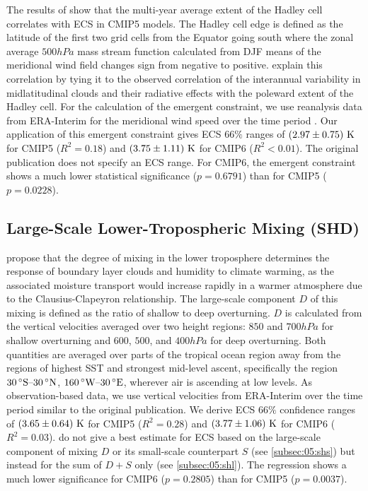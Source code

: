 The results of \textcite{Lipat2017} show that the multi-year average extent of
the Hadley cell correlates with \acs{ECS} in \acs{CMIP}5 models. The Hadley
cell edge is defined as the latitude of the first two grid cells from the
Equator going south where the zonal average $500 \unit{hPa}$ mass stream
function calculated from \ac{DJF} means of the meridional wind field changes
sign from negative to positive. \Textcite{Lipat2017} explain this correlation
by tying it to the observed correlation of the interannual variability in
midlatitudinal clouds and their radiative effects with the poleward extent of
the Hadley cell. For the calculation of the emergent constraint, we use
reanalysis data from ERA-Interim \autocite{Dee2011} for the meridional wind
speed over the time period . Our application of this emergent
constraint gives \ac{ECS} $66 \unit{\%}$ ranges of
$\pmrangeunit{2.97}{0.75}{K}$ for \acs{CMIP}5 ($R^2 = 0.18$) and
$\pmrangeunit{3.75}{1.11}{K}$ for \acs{CMIP}6 ($R^2 < 0.01$). The original
publication does not specify an \ac{ECS} range. For \acs{CMIP}6, the emergent
constraint shows a much lower statistical significance ($p = 0.6791$) than for
\acs{CMIP}5 ($p = 0.0228$).


\subsection{Large-Scale Lower-Tropospheric Mixing (SHD)}
\label{subsec:05:shd}

\textcite{Sherwood2014} propose that the degree of mixing in the lower
troposphere determines the response of boundary layer clouds and humidity to
climate warming, as the associated moisture transport would increase rapidly in
a warmer atmosphere due to the Clausius-Clapeyron relationship. The large-scale
component $D$ of this mixing is defined as the ratio of shallow to deep
overturning. $D$ is calculated from the vertical velocities averaged over two
height regions: $850$ and $700 \unit{hPa}$ for shallow overturning and $600$,
$500$, and $400 \unit{hPa}$ for deep overturning. Both quantities are averaged
over parts of the tropical ocean region away from the regions of highest
\ac{SST} and strongest mid-level ascent, specifically the region $\range{30
  \unit{\degree S}}{30 \unit{\degree N}}$, $\range{160 \unit{\degree W}}{30
  \unit{\degree E}}$, wherever air is ascending at low levels. As
observation-based data, we use vertical velocities from ERA-Interim
\autocite{Dee2011} over the time period  similar to the
original publication. We derive \ac{ECS} $66 \unit{\%}$ confidence ranges of
$\pmrangeunit{3.65}{0.64}{K}$ for \acs{CMIP}5 ($R^2 = 0.28$) and
$\pmrangeunit{3.77}{1.06}{K}$ for \acs{CMIP}6 ($R^2 = 0.03$).
\Textcite{Sherwood2014} do not give a best estimate for \ac{ECS} based on the
large-scale component of mixing $D$ or its small-scale counterpart $S$ (see
\cref{subsec:05:shs}) but instead for the sum of $D + S$ only (see
\cref{subsec:05:shl}). The regression shows a much lower significance for
\acs{CMIP}6 ($p = 0.2805$) than for \acs{CMIP}5 ($p = 0.0037$).

